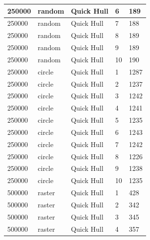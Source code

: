 \documentclass[12pt]{article}
\begin{document}
\begin{longtable}{|l|l|l|l|l|}
250000       & random            & Quick Hull & 6          & 189                           \\ \hline
250000       & random            & Quick Hull & 7          & 188                           \\ \hline
250000       & random            & Quick Hull & 8          & 189                           \\ \hline
250000       & random            & Quick Hull & 9          & 189                           \\ \hline
250000       & random            & Quick Hull & 10         & 190                           \\ \hline
250000       & circle            & Quick Hull & 1          & 1287                          \\ \hline
250000       & circle            & Quick Hull & 2          & 1237                          \\ \hline
250000       & circle            & Quick Hull & 3          & 1242                          \\ \hline
250000       & circle            & Quick Hull & 4          & 1241                          \\ \hline
250000       & circle            & Quick Hull & 5          & 1235                          \\ \hline
250000       & circle            & Quick Hull & 6          & 1243                          \\ \hline
250000       & circle            & Quick Hull & 7          & 1242                          \\ \hline
250000       & circle            & Quick Hull & 8          & 1226                          \\ \hline
250000       & circle            & Quick Hull & 9          & 1238                          \\ \hline
250000       & circle            & Quick Hull & 10         & 1235                          \\ \hline
500000       & raster            & Quick Hull & 1          & 428                           \\ \hline
500000       & raster            & Quick Hull & 2          & 342                           \\ \hline
500000       & raster            & Quick Hull & 3          & 345                           \\ \hline
500000       & raster            & Quick Hull & 4          & 357                           \\ \hline

\end{longtable}
\end{document}
